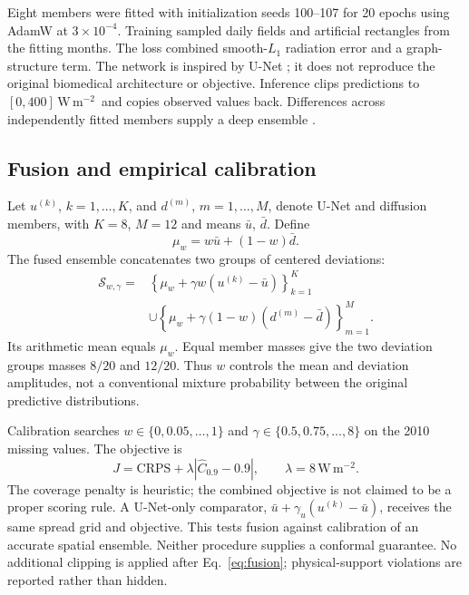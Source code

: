 \documentclass[preprint,12pt,authoryear]{elsarticle}
\newcommand{\wm}{\ensuremath{\mathrm{W\,m^{-2}}}}
\begin{document}
Eight members were fitted with initialization seeds 100--107 for 20 epochs using AdamW at $3\times10^{-4}$. Training sampled daily fields and artificial rectangles from the fitting months. The loss combined smooth-$L_1$ radiation error and a graph-structure term. The network is inspired by U-Net \citep{ronneberger2015}; it does not reproduce the original biomedical architecture or objective. Inference clips predictions to $[0,400]$\,\wm\ and copies observed values back. Differences across independently fitted members supply a deep ensemble \citep{lakshminarayanan2017}.

\subsection{Fusion and empirical calibration}
Let $u^{(k)}$, $k=1,\ldots,K$, and $d^{(m)}$, $m=1,\ldots,M$, denote U-Net and diffusion members, with $K=8$, $M=12$ and means $\bar u$, $\bar d$. Define
\begin{equation}\mu_w=w\bar u+(1-w)\bar d.\end{equation}
The fused ensemble concatenates two groups of centered deviations:
\begin{align}
\mathcal S_{w,\gamma}={}&\left\{\mu_w+\gamma w(u^{(k)}-\bar u)\right\}_{k=1}^{K}\nonumber\\
&\cup\left\{\mu_w+\gamma(1-w)(d^{(m)}-\bar d)\right\}_{m=1}^{M}.
\label{eq:fusion}\end{align}
Its arithmetic mean equals $\mu_w$. Equal member masses give the two deviation groups masses $8/20$ and $12/20$. Thus $w$ controls the mean and deviation amplitudes, not a conventional mixture probability between the original predictive distributions.

Calibration searches $w\in\{0,0.05,\ldots,1\}$ and $\gamma\in\{0.5,0.75,\ldots,8\}$ on the 2010 missing values. The objective is
\begin{equation}J=\mathrm{CRPS}+\lambda|\widehat C_{0.9}-0.9|,\qquad\lambda=8\,\wm.\label{eq:objective}\end{equation}
The coverage penalty is heuristic; the combined objective is not claimed to be a proper scoring rule. A U-Net-only comparator, $\bar u+\gamma_u(u^{(k)}-\bar u)$, receives the same spread grid and objective. This tests fusion against calibration of an accurate spatial ensemble. Neither procedure supplies a conformal guarantee. No additional clipping is applied after Eq.~\ref{eq:fusion}; physical-support violations are reported rather than hidden.
\end{document}
